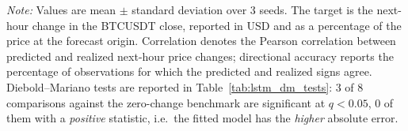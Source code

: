 \begin{table}[H]
\begin{threeparttable}
\begin{tablenotes}[flushleft]
\footnotesize
\item \textit{Note:} Values are mean $\pm$ standard deviation over 3 seeds. The target is the next-hour change in the BTCUSDT close, reported in USD and as a percentage of the price at the forecast origin. Correlation denotes the Pearson correlation between predicted and realized next-hour price changes; directional accuracy reports the percentage of observations for which the predicted and realized signs agree. Diebold--Mariano tests are reported in Table~\ref{tab:lstm_dm_tests}: 3 of 8 comparisons against the zero-change benchmark are significant at $q<0.05$, 0 of them with a \emph{positive} statistic, i.e.\ the fitted model has the \emph{higher} absolute error.
\end{tablenotes}
\end{threeparttable}
\end{table}